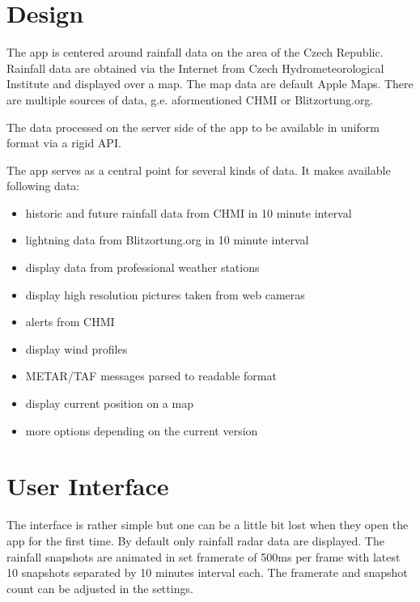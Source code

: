 \documentclass[11pt,a4paper]{article}
\begin{document}
\section{Design}
The app is centered around rainfall data on the area of the Czech Republic. Rainfall data are obtained via the Internet from Czech Hydrometeorological Institute and displayed over a map. The map data are default Apple Maps. There are multiple sources of data, g.e. aformentioned CHMI or Blitzortung.org.

The data processed on the server side of the app to be available in uniform format via a rigid API.

The app serves as a central point for several kinds of data. It makes available following data:
\begin{itemize}
    \item historic and future rainfall data from CHMI in 10 minute interval
    \item lightning data from Blitzortung.org in 10 minute interval
    \item display data from professional weather stations
    \item display high resolution pictures taken from web cameras
    \item alerts from CHMI
    \item display wind profiles
    \item METAR/TAF messages parsed to readable format
    \item display current position on a map
    \item more options depending on the current version
\end{itemize}

\section{User Interface}
The interface is rather simple but one can be a little bit lost when they open the app for the first time. By default only rainfall radar data are displayed.
The rainfall snapshots are animated in set framerate of 500ms per frame with latest 10 snapshots separated by 10 minutes interval each. The framerate and snapshot count can be adjusted in the settings.
\end{document}
